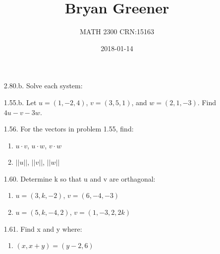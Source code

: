 \documentclass[12pt]{article}
\title{Bryan Greener}
\author{MATH 2300 CRN:15163}
\date{2018-01-14}
\begin{document}
\maketitle

\TabPositions{4cm}
\begin{enumerate}
\item[2.80.b.] Solve each system:\\
\item[1.55.b.] Let $u=(1,-2,4)$, $v=(3,5,1)$, and $w=(2,1,-3)$. Find $4u-v-3w$.
\item[1.56.] For the vectors in problem 1.55, find:
	\begin{enumerate}
	\item $u \cdot v$, $u \cdot w$, $v \cdot w$
	
	\item $||u||$, $||v||$, $||w||$
	\end{enumerate}
\item[1.60.] Determine k so that u and v are orthagonal:
	\begin{enumerate}
	\item $u=(3,k,-2)$, $v=(6,-4,-3)$
	
	\item $u=(5,k,-4,2)$, $v=(1,-3,2,2k)$
	\end{enumerate}
\item[1.61.] Find x and y where:
	\begin{enumerate}
	\item $(x,x+y)=(y-2,6)$
	

\end{enumerate}
\end{enumerate}
\end{document}

